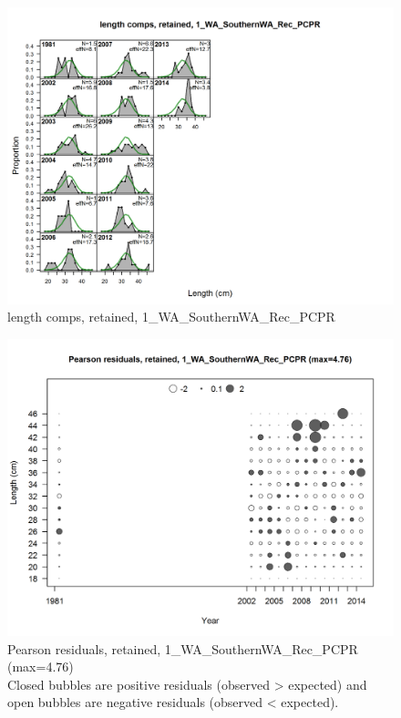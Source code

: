 \documentclass[12pt,]{article}
\begin{document}
\FloatBarrier

\FloatBarrier

\FloatBarrier

\FloatBarrier

\FloatBarrier

\FloatBarrier

\begin{figure}[htbp]
\centering
\includegraphics{./r4ss/plots_mod1/comp_lenfit_flt1mkt2.png}
\caption{length comps, retained, 1\_WA\_SouthernWA\_Rec\_PCPR
\label{fig:mod1_1_comp_lenfit_flt1mkt2}}
\end{figure}

\begin{figure}[htbp]
\centering
\includegraphics{./r4ss/plots_mod1/comp_lenfit_residsflt1mkt2.png}
\caption{Pearson residuals, retained, 1\_WA\_SouthernWA\_Rec\_PCPR
(max=4.76)\\
Closed bubbles are positive residuals (observed \textgreater{} expected)
and open bubbles are negative residuals (observed \textless{} expected).
\label{fig:mod1_2_comp_lenfit_residsflt1mkt2}}
\end{figure}
\end{document}
